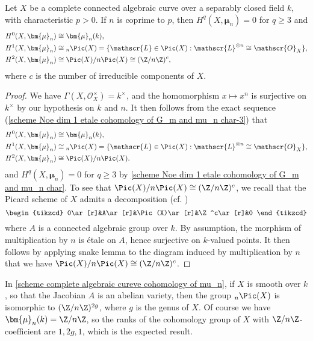 \begin{corollary}\label{scheme complete algebraic cureve cohomology of mu_n}
Let $X$ be a complete connected algebraic curve over a separably closed field $k$, with characteristic $p>0$. If $n$ is coprime to $p$, then $H^q(X,\bm{\mu}_n)=0$ for $q\geq 3$ and
\begin{align*}
H^0(X,\bm{\mu}_n)&\cong\bm{\mu}_n(k),\\
H^1(X,\bm{\mu}_n)&\cong {_n\Pic(X)}=\{\mathscr{L}\in\Pic(X):\mathscr{L}^{\otimes n}\cong\mathscr{O}_X\},\\
H^2(X,\bm{\mu}_n)&\cong \Pic(X)/n\Pic(X)\cong(\Z/n\Z)^c,
\end{align*}
where $c$ is the number of irreducible components of $X$.
\end{corollary}
\begin{proof}
We have $\Gamma(X,\mathscr{O}_X^\times)=k^\times$, and the homomorphism $x\mapsto x^n$ is surjective on $k^\times$ by our hypothesis on $k$ and $n$. It then follows from the exact sequence (\ref{scheme Noe dim 1 etale cohomology of G_m and mu_n char-3}) that
\begin{align*}
H^0(X,\bm{\mu}_n)&\cong\bm{\mu}_n(k),\\
H^1(X,\bm{\mu}_n)&\cong {_n\Pic(X)}=\{\mathscr{L}\in\Pic(X):\mathscr{L}^{\otimes n}\cong\mathscr{O}_X\},\\
H^2(X,\bm{\mu}_n)&\cong \Pic(X)/n\Pic(X).
\end{align*}
and $H^q(X,\bm{\mu}_n)=0$ for $q\geq 3$ by \cref{scheme Noe dim 1 etale cohomology of G_m and mu_n char}. To see that $\Pic(X)/n\Pic(X)\cong(\Z/n\Z)^c$, we recall that the Picard scheme of $X$ admits a decomposition (cf. \cite{TDTE_V})
\[\begin{tikzcd}
0\ar[r]&A\ar[r]&\Pic(X)\ar[r]&\Z^c\ar[r]&0
\end{tikzcd}\]
where $A$ is a connected algebraic group over $k$. By assumption, the morphism of multiplication by $n$ is \'etale on $A$, hence surjective on $k$-valued points. It then follows by applying snake lemma to the diagram induced by multiplication by $n$ that we have $\Pic(X)/n\Pic(X)\cong(\Z/n\Z)^c$.
\end{proof}

\begin{remark}
In \cref{scheme complete algebraic cureve cohomology of mu_n}, if $X$ is smooth over $k$, so that the Jacobian $A$ is an abelian variety, then the group ${_n\Pic(X)}$ is isomorphic to $(\Z/n\Z)^{2g}$, where $g$ is the genus of $X$. Of course we have $\bm{\mu}_n(k)=\Z/n\Z$, so the ranks of the cohomology group of $X$ with $\Z/n\Z$-coefficient are $1,2g,1$, which is the expected result.
\end{remark}

